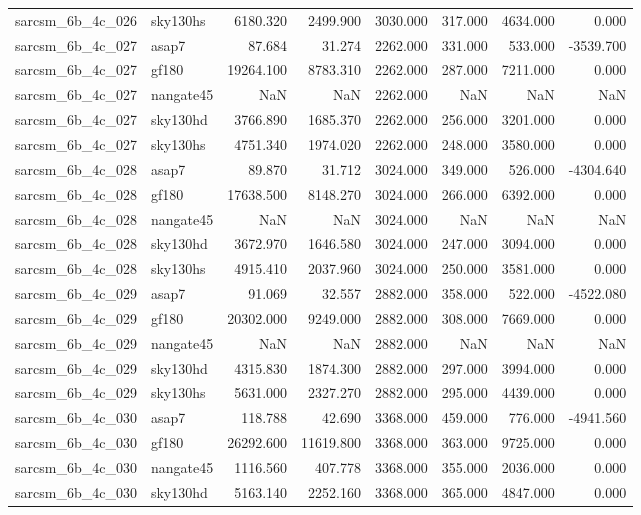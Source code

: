 \begin{tabular}{llrrrrrr}
sarcsm\_6b\_4c\_026 & sky130hs & 6180.320 & 2499.900 & 3030.000 & 317.000 & 4634.000 & 0.000 \\
sarcsm\_6b\_4c\_027 & asap7 & 87.684 & 31.274 & 2262.000 & 331.000 & 533.000 & -3539.700 \\
sarcsm\_6b\_4c\_027 & gf180 & 19264.100 & 8783.310 & 2262.000 & 287.000 & 7211.000 & 0.000 \\
sarcsm\_6b\_4c\_027 & nangate45 & NaN & NaN & 2262.000 & NaN & NaN & NaN \\
sarcsm\_6b\_4c\_027 & sky130hd & 3766.890 & 1685.370 & 2262.000 & 256.000 & 3201.000 & 0.000 \\
sarcsm\_6b\_4c\_027 & sky130hs & 4751.340 & 1974.020 & 2262.000 & 248.000 & 3580.000 & 0.000 \\
sarcsm\_6b\_4c\_028 & asap7 & 89.870 & 31.712 & 3024.000 & 349.000 & 526.000 & -4304.640 \\
sarcsm\_6b\_4c\_028 & gf180 & 17638.500 & 8148.270 & 3024.000 & 266.000 & 6392.000 & 0.000 \\
sarcsm\_6b\_4c\_028 & nangate45 & NaN & NaN & 3024.000 & NaN & NaN & NaN \\
sarcsm\_6b\_4c\_028 & sky130hd & 3672.970 & 1646.580 & 3024.000 & 247.000 & 3094.000 & 0.000 \\
sarcsm\_6b\_4c\_028 & sky130hs & 4915.410 & 2037.960 & 3024.000 & 250.000 & 3581.000 & 0.000 \\
sarcsm\_6b\_4c\_029 & asap7 & 91.069 & 32.557 & 2882.000 & 358.000 & 522.000 & -4522.080 \\
sarcsm\_6b\_4c\_029 & gf180 & 20302.000 & 9249.000 & 2882.000 & 308.000 & 7669.000 & 0.000 \\
sarcsm\_6b\_4c\_029 & nangate45 & NaN & NaN & 2882.000 & NaN & NaN & NaN \\
sarcsm\_6b\_4c\_029 & sky130hd & 4315.830 & 1874.300 & 2882.000 & 297.000 & 3994.000 & 0.000 \\
sarcsm\_6b\_4c\_029 & sky130hs & 5631.000 & 2327.270 & 2882.000 & 295.000 & 4439.000 & 0.000 \\
sarcsm\_6b\_4c\_030 & asap7 & 118.788 & 42.690 & 3368.000 & 459.000 & 776.000 & -4941.560 \\
sarcsm\_6b\_4c\_030 & gf180 & 26292.600 & 11619.800 & 3368.000 & 363.000 & 9725.000 & 0.000 \\
sarcsm\_6b\_4c\_030 & nangate45 & 1116.560 & 407.778 & 3368.000 & 355.000 & 2036.000 & 0.000 \\
sarcsm\_6b\_4c\_030 & sky130hd & 5163.140 & 2252.160 & 3368.000 & 365.000 & 4847.000 & 0.000 \\

\end{tabular}
